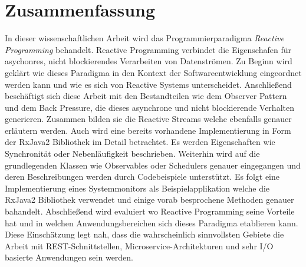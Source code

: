 \pagestyle{empty} %

\section*{Zusammenfassung} %
\label{cha:zusammenfassung}
In dieser wissenschaftlichen Arbeit wird das Programmierparadigma \textit{Reactive Programming} behandelt. Reactive Programming verbindet die Eigenschafen für asychonres, nicht blockierendes Verarbeiten von Datenströmen. Zu Beginn wird geklärt wie dieses Paradigma in den Kontext der Softwareentwicklung eingeordnet werden kann und wie es sich von Reactive Systems unterscheidet. Anschließend beschäftigt sich diese Arbeit mit den Bestandteilen wie dem Observer Pattern und dem Back Pressure, die dieses asynchrone und nicht blockierende Verhalten generieren. Zusammen bilden sie die Reactive Streams welche ebenfalls genauer erläutern werden. Auch wird eine bereits vorhandene Implementierung in Form der RxJava2 Bibliothek im Detail betrachtet. Es werden Eigenschaften wie Synchronität oder Nebenläufigkeit beschrieben. Weiterhin wird auf die grundlegenden Klassen wie Observables oder Schedulers genauer eingegangen und deren Beschreibungen werden durch Codebeispiele unterstützt. Es folgt eine Implementierung eines Systemmonitors als Beispielapplikation welche die RxJava2 Bibliothek verwendet und einige vorab besprochene Methoden genauer bahandelt. Abschließend wird evaluiert wo Reactive Programming seine Vorteile hat und in welchen Anwendungsbereichen sich dieses Paradigma etablieren kann. Diese Einschätzung legt nah, dass die wahrscheinlich sinnvollsten Gebiete die Arbeit mit REST-Schnittstellen, Microservice-Architekturen und sehr I/O basierte Anwendungen sein werden.


\vspace*{1,5cm}
